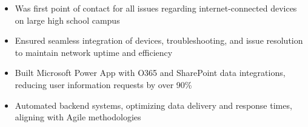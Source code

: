 \makecvheader

\par\bigskip
{}
\par\smallskip
\begin{minipage}{13.75cm}
  \begin{minipage}{6.5cm}
    \begin{itemize}
      \item Was first point of contact for all issues regarding internet-connected devices on large high school campus
      \item Ensured seamless integration of devices, troubleshooting, and issue resolution to maintain network uptime and efficiency
    \end{itemize}
  \end{minipage}
  \hfill
  \begin{minipage}{6.5cm}
    \begin{itemize}
      \item Built Microsoft Power App with O365 and SharePoint data integrations, reducing user information requests by over 90\%
      \item Automated backend systems, optimizing data delivery and response times, aligning with Agile methodologies
    \end{itemize}
  \end{minipage}
\end{minipage}
\par\smallskip
\divider

